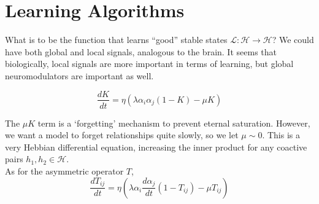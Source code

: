 \documentclass[twocolumn, 10pt]{article}
\begin{document}
\section{Learning Algorithms}
What is to be the function that learns ``good'' stable states $\mathcal{L} : \mathcal{H} \to \mathcal{H} $? We could have both global and local signals, analogous to the brain. It seems that biologically, local signals are more important in terms of learning, but global neuromodulators are important as well.

\begin{equation} 
\frac{dK}{dt} = \eta \left( \lambda \alpha_i\alpha_j(1-K) - \mu K \right)
\end{equation}

The $\mu K$ term is a `forgetting' mechanism to prevent eternal saturation. However, we want a model to forget relationships quite slowly, so we let $\mu  \sim 0$. This is a very Hebbian differential equation, increasing the inner product for any coactive pairs $h_1, h_2 \in \mathcal{H}$.\\

As for the asymmetric operator $T$,
\begin{equation}
    \frac{dT_{ij}}{dt} = \eta \left( \lambda \alpha_i \frac{d\alpha_j}{dt} (1-T_{ij}) - \mu T_{ij} \right) 
\end{equation}
\end{document}
